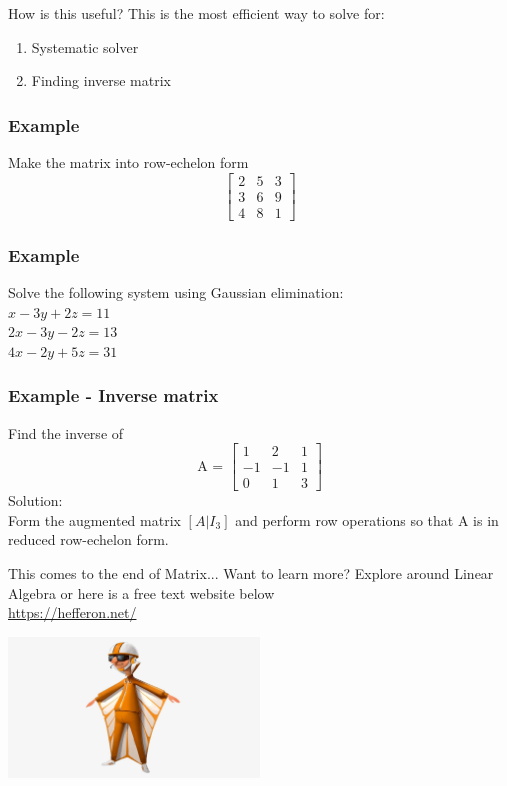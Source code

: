 \documentclass[
	11pt, %
]{beamer}
\begin{document}
\begin{frame}{How is this useful?}
    This is the most efficient way to solve for:
    \begin{block}{}
        \begin{enumerate}
            \item Systematic solver
            \item Finding inverse matrix
        \end{enumerate}
    \end{block}
\end{frame}
\begin{frame}[t]
    \frametitle{Example}
    Make the matrix into row-echelon form
    \[
        \begin{bmatrix}
            2 & 5 & 3\\
            3 & 6 & 9\\
            4 & 8 & 1
        \end{bmatrix}
    \]
\end{frame}

\begin{frame}[t]
    \frametitle{Example}
    Solve the following system using Gaussian elimination:\\
    $x - 3y + 2z = 11$\\
    $2x - 3y - 2z = 13$\\
    $4x - 2y + 5z = 31$
\end{frame}
\begin{frame}
\end{frame}

\begin{frame}[t]
    \frametitle{Example - Inverse matrix}
    Find the inverse of 
    \[
        \text{A = }
        \begin{bmatrix}
            1 & 2 & 1\\
            -1 & -1 & 1\\
            0 & 1 & 3
        \end{bmatrix}
    \]
    Solution:\\
    Form the augmented matrix $[A|I_3]$ and perform row operations so that A is in reduced row-echelon form.
\end{frame}
\begin{frame}    
\end{frame}

\begin{frame}{This comes to the end of Matrix...}
    Want to learn more? Explore around Linear Algebra or here is a free text website below\\
    \url{https://hefferon.net/}\\
    \begin{center}
        \includegraphics[width=0.5\textwidth]{Vector.jpg}
    \end{center}
\end{frame}
\end{document}
